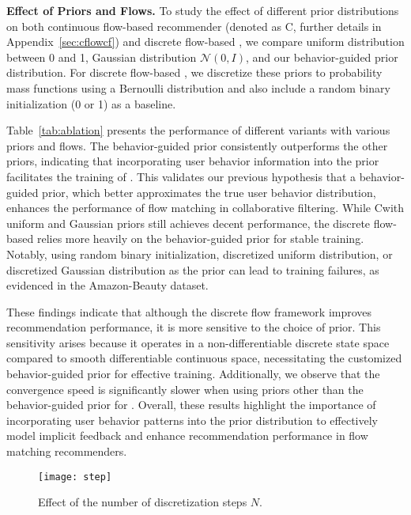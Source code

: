 \documentclass[sigconf]{acmart}
\begin{document}
\noindent \textbf{Effect of Priors and Flows.}
To study the effect of different prior distributions on both continuous flow-based recommender (denoted as C\ours, further details in Appendix~\ref{sec:cflowcf}) and discrete flow-based \ours, we compare uniform distribution between 0 and 1, Gaussian distribution $\mathcal N (0, I)$, and our behavior-guided prior distribution. For discrete flow-based \ours, we discretize these priors to probability mass functions using a Bernoulli distribution and also include a random binary initialization (0 or 1) as a baseline.

Table~\ref{tab:ablation} presents the performance of different variants with various priors and flows. The behavior-guided prior consistently outperforms the other priors, indicating that incorporating user behavior information into the prior facilitates the training of \ours. This validates our previous hypothesis that a behavior-guided prior, which better approximates the true user behavior distribution, enhances the performance of flow matching in collaborative filtering. While C\ours with uniform and Gaussian priors still achieves decent performance, the discrete flow-based \ours relies more heavily on the behavior-guided prior for stable training. Notably, using random binary initialization, discretized uniform distribution, or discretized Gaussian distribution as the prior can lead to training failures, as evidenced in the Amazon-Beauty dataset. 

These findings indicate that although the discrete flow framework improves recommendation performance, it is more sensitive to the choice of prior. This sensitivity arises because it operates in a non-differentiable discrete state space compared to smooth differentiable continuous space, necessitating the customized behavior-guided prior for effective training. Additionally, we observe that the convergence speed is significantly slower when using priors other than the behavior-guided prior for \ours. Overall, these results highlight the importance of incorporating user behavior patterns into the prior distribution to effectively model implicit feedback and enhance recommendation performance in flow matching recommenders.

\begin{figure}[ht]
	\setlength{\abovecaptionskip}{-0.0cm}
    \setlength{\belowcaptionskip}{-0.2cm}
    \texttt{[image: step]}
    \caption{Effect of the number of discretization steps $N$.}
    \label{fig:step}
\end{figure}
\end{document}
